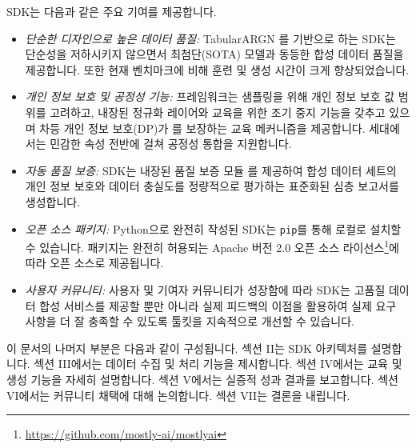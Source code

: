 SDK는 다음과 같은 주요 기여를 제공합니다.
\begin{itemize}
\item \textit{단순한 디자인으로 높은 데이터 품질:} TabularARGN \cite{tabularargn}를 기반으로 하는 SDK는 단순성을 저하시키지 않으면서 최첨단(SOTA) 모델과 동등한 합성 데이터 품질을 제공합니다. 또한 현재 벤치마크에 비해 훈련 및 생성 시간이 크게 향상되었습니다.
\item \textit{개인 정보 보호 및 공정성 기능:} 프레임워크는 샘플링을 위해 개인 정보 보호 값 범위를 고려하고, 내장된 정규화 레이어와 교육을 위한 조기 중지 기능을 갖추고 있으며 차등 개인 정보 보호(DP)가 \cite{dwo14-dp}를 보장하는 교육 메커니즘을 제공합니다. 세대에서는 민감한 속성 \cite{krc23} 전반에 걸쳐 공정성 통합을 지원합니다.
\item \textit{자동 품질 보증:} SDK는 내장된 품질 보증 모듈 \cite{qareport}를 제공하여 합성 데이터 세트의 개인 정보 보호와 데이터 충실도를 정량적으로 평가하는 표준화된 심층 보고서를 생성합니다.
\item \textit{오픈 소스 패키지:} Python으로 완전히 작성된 SDK는 \verb|pip|를 통해 로컬로 설치할 수 있습니다. 패키지는 완전히 허용되는 Apache 버전 2.0 오픈 소스 라이선스\footnote{ \url{https://github.com/mostly-ai/mostlyai}}에 따라 오픈 소스로 제공됩니다.
\item \textit{사용자 커뮤니티:} 사용자 및 기여자 커뮤니티가 성장함에 따라 SDK는 고품질 데이터 합성 서비스를 제공할 뿐만 아니라 실제 피드백의 이점을 활용하여 실제 요구 사항을 더 잘 충족할 수 있도록 툴킷을 지속적으로 개선할 수 있습니다.
\end{itemize}

이 문서의 나머지 부분은 다음과 같이 구성됩니다. 섹션 II는 SDK 아키텍처를 설명합니다. 섹션 III에서는 데이터 수집 및 처리 기능을 제시합니다. 섹션 IV에서는 교육 및 생성 기능을 자세히 설명합니다. 섹션 V에서는 실증적 성과 결과를 보고합니다. 섹션 VI에서는 커뮤니티 채택에 대해 논의합니다. 섹션 VII는 결론을 내립니다.
